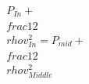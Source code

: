 \documentclass[preview]{standalone}
\begin{document}
\begin{align*}
P_{In} + \\frac{1}{2} \\rho v_{In}^2 = P_{mid} + \\frac{1}{2} \\rho v_{Middle}^2
\end{align*}
\end{document}
